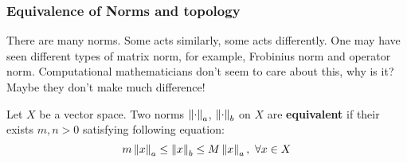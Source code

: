 \subsubsection{Equivalence of Norms and topology}
There are many norms. Some acts similarly, some acts differently. One may have seen different types of matrix norm, for example, Frobinius norm and operator norm. Computational mathematicians don't seem to care about this, why is it? Maybe they don't make much difference!
\begin{definition}\label{equivalent norms}\rm\nextline
	Let $X$ be a vector space. Two norms $\left\|{\cdot}\right\|_a$, $\left\|{\cdot}\right\|_b$ on $X$ are {\bf equivalent} if their exists $m,n>0$ satisfying following equation:
	$$
		m\left\|{x}\right\|_a\leq \left\|{x}\right\|_b\leq M\left\|{x}\right\|_a,\,\,\forall x\in X
	$$
\end{definition}

